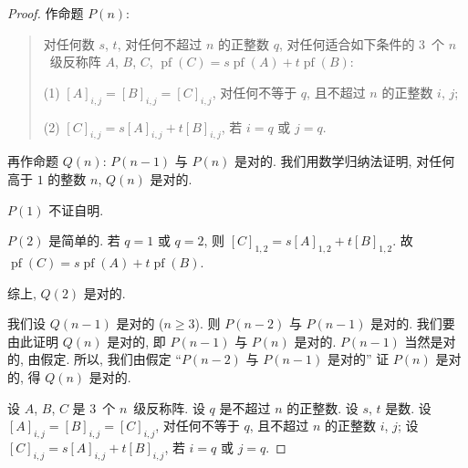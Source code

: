 \documentclass[../libro.tex]{subfiles}
\begin{document}

\begin{proof}
    作命题 \(P(n)\):
    \begin{quotation}
        对任何数 \(s\), \(t\),
        对任何不超过 \(n\) 的正整数 \(q\),
        对任何适合如下条件的 \(3\)~个 \(n\)~级反称阵 \(A\), \(B\), \(C\),
        \(
            \operatorname{pf} {(C)}
            = s \operatorname{pf} {(A)}
            + t \operatorname{pf} {(B)}
        \):

        (1)
        \([A]_{i,j} = [B]_{i,j} = [C]_{i,j}\),
        对任何不等于 \(q\), 且不超过 \(n\) 的正整数 \(i\), \(j\);

        (2)
        \([C]_{i,j} = s[A]_{i,j} + t[B]_{i,j}\),
        若 \(i = q\) 或 \(j = q\).
    \end{quotation}
    再作命题 \(Q(n)\):
    \(P(n-1)\) 与 \(P(n)\) 是对的.
    我们用数学归纳法证明,
    对任何高于 \(1\) 的整数 \(n\), \(Q(n)\) 是对的.

    \(P(1)\) 不证自明.

    \(P(2)\) 是简单的.
    若 \(q = 1\) 或 \(q = 2\),
    则 \([C]_{1,2} = s[A]_{1,2} + t[B]_{1,2}\).
    故 \(\operatorname{pf} {(C)}
        = s \operatorname{pf} {(A)}
    + t \operatorname{pf} {(B)}\).

    综上, \(Q(2)\) 是对的.

    我们设 \(Q(n-1)\) 是对的 (\(n \geq 3\)).
    则 \(P(n-2)\) 与 \(P(n-1)\) 是对的.
    我们要由此证明 \(Q(n)\) 是对的,
    即 \(P(n-1)\) 与 \(P(n)\) 是对的.
    \(P(n-1)\) 当然是对的, 由假定.
    所以, 我们由假定
    ``\(P(n-2)\) 与 \(P(n-1)\) 是对的''
    证 \(P(n)\) 是对的,
    得 \(Q(n)\) 是对的.

    设 \(A\), \(B\), \(C\) 是 \(3\)~个 \(n\)~级反称阵.
    设 \(q\) 是不超过 \(n\) 的正整数.
    设 \(s\), \(t\) 是数.
    设 \([A]_{i,j} = [B]_{i,j} = [C]_{i,j}\),
    对任何不等于 \(q\), 且不超过 \(n\) 的正整数 \(i\), \(j\);
    设 \([C]_{i,j} = s[A]_{i,j} + t[B]_{i,j}\),
    若 \(i = q\) 或 \(j = q\).


\end{proof}
\end{document}
